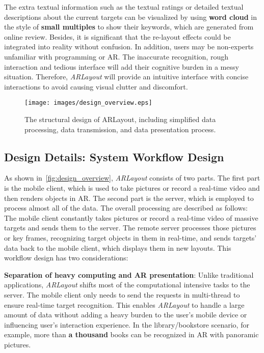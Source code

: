 The extra textual information such as the textual ratings
or detailed textual descriptions about the current targets can be visualized
by using \textbf{word cloud} in the style of \textbf{small multiples} to show their keywords,
which are generated from online review.
Besides, it is significant that the re-layout effects
could be integrated into reality without confusion.
In addition, users may be non-experts unfamiliar with programming or AR.
The inaccurate recognition, rough interaction and tedious interface
will add their cognitive burden in a messy situation.
Therefore, \textit{ARLayout} will provide an intuitive interface
with concise interactions to avoid causing visual clutter and discomfort.


\begin{figure}[htp]
    \centering
    \texttt{[image: images/design\_overview.eps]}
    \caption{
        The structural design of ARLayout,
        including simplified data processing, data transmission, and data presentation process.
    }
    \label{fig:design_overview}
\end{figure}



\subsection{Design Details: System Workflow Design}

As shown in~\autoref{fig:design_overview}, \textit{ARLayout} consists of two parts.
The first part is the mobile client, which is used to take pictures or record a real-time video and then renders objects in AR.
The second part is the server, which is employed to process almost all of the data.
The overall processing are described as follows:
The mobile client constantly takes pictures or record a real-time video of massive targets and sends them to the server.
The remote server processes those pictures or key frames, recognizing target objects in them in real-time,
and sends targets' data back to the mobile client,
which displays them in new layouts.
This workflow design has two considerations:


\textbf{Separation of heavy computing and AR presentation}:
Unlike traditional applications,
\textit{ARLayout} shifts most of the computational intensive tasks to the server.
The mobile client only needs to send the requests in multi-thread to ensure real-time target recognition.
This enables \textit{ARLayout} to handle a large amount of data
without adding a heavy burden to the user’s mobile device or influencing user's interaction experience.
In the library/bookstore scenario, for example, more than \textbf{a thousand} books can be recognized in AR
with panoramic pictures.

